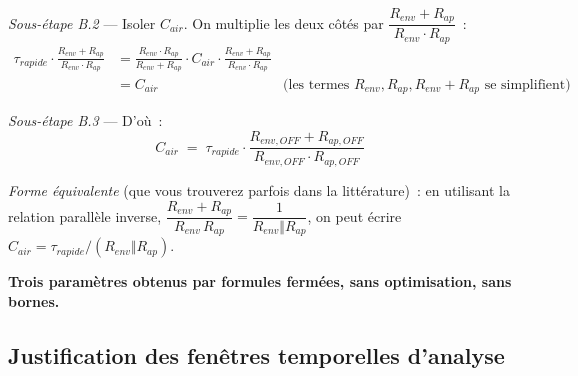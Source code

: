 \documentclass[11pt,a4paper]{article}
\begin{document}
\begin{demo}
\emph{Sous-étape B.2} — Isoler $C_{air}$. On multiplie les deux côtés par
$\dfrac{R_{env}+R_{ap}}{R_{env} \cdot R_{ap}}$~:
\begin{align*}
\tau_{rapide} \cdot \frac{R_{env}+R_{ap}}{R_{env} \cdot R_{ap}}
&= \frac{R_{env} \cdot R_{ap}}{R_{env} + R_{ap}} \cdot C_{air} \cdot \frac{R_{env}+R_{ap}}{R_{env} \cdot R_{ap}} \\
&= C_{air} & \text{(les termes }R_{env}, R_{ap}, R_{env}+R_{ap}\text{ se simplifient)}
\end{align*}

\emph{Sous-étape B.3} — D'où~:
\begin{equation}
\boxed{\;C_{air} \;=\; \tau_{rapide} \cdot \frac{R_{env,OFF} + R_{ap,OFF}}{R_{env,OFF} \cdot R_{ap,OFF}}\;}
\label{eq:Cair_formule}
\end{equation}

\emph{Forme équivalente} (que vous trouverez parfois dans la littérature)~: en utilisant
la relation parallèle inverse, $\dfrac{R_{env}+R_{ap}}{R_{env}\,R_{ap}} = \dfrac{1}{R_{env}\Vert R_{ap}}$,
on peut écrire $C_{air} = \tau_{rapide} / (R_{env}\Vert R_{ap})$.

\medskip
\textbf{Trois paramètres obtenus par formules fermées, sans optimisation, sans bornes.}
\end{demo}

\subsection{Justification des fenêtres temporelles d'analyse}\label{sec:fenetres}
\end{document}
